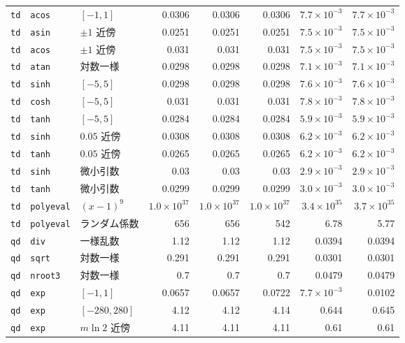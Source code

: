 \documentclass[a4paper,10pt]{ltjsarticle}
\begin{document}
\begin{longtable}{lll rrr rr}
\texttt{td} & \texttt{acos} & $[-1,1]$ & 0.0306 & 0.0306 & 0.0306 & $7.7\times10^{-3}$ & $7.7\times10^{-3}$ \\
\texttt{td} & \texttt{asin} & $\pm1$ 近傍 & 0.0251 & 0.0251 & 0.0251 & $7.5\times10^{-3}$ & $7.5\times10^{-3}$ \\
\texttt{td} & \texttt{acos} & $\pm1$ 近傍 & 0.031 & 0.031 & 0.031 & $7.5\times10^{-3}$ & $7.5\times10^{-3}$ \\
\texttt{td} & \texttt{atan} & 対数一様 & 0.0298 & 0.0298 & 0.0298 & $7.1\times10^{-3}$ & $7.1\times10^{-3}$ \\
\texttt{td} & \texttt{sinh} & $[-5,5]$ & 0.0298 & 0.0298 & 0.0298 & $7.6\times10^{-3}$ & $7.6\times10^{-3}$ \\
\texttt{td} & \texttt{cosh} & $[-5,5]$ & 0.031 & 0.031 & 0.031 & $7.8\times10^{-3}$ & $7.8\times10^{-3}$ \\
\texttt{td} & \texttt{tanh} & $[-5,5]$ & 0.0284 & 0.0284 & 0.0284 & $5.9\times10^{-3}$ & $5.9\times10^{-3}$ \\
\texttt{td} & \texttt{sinh} & $0.05$ 近傍 & 0.0308 & 0.0308 & 0.0308 & $6.2\times10^{-3}$ & $6.2\times10^{-3}$ \\
\texttt{td} & \texttt{tanh} & $0.05$ 近傍 & 0.0265 & 0.0265 & 0.0265 & $6.2\times10^{-3}$ & $6.2\times10^{-3}$ \\
\texttt{td} & \texttt{sinh} & 微小引数 & 0.03 & 0.03 & 0.03 & $2.9\times10^{-3}$ & $2.9\times10^{-3}$ \\
\texttt{td} & \texttt{tanh} & 微小引数 & 0.0299 & 0.0299 & 0.0299 & $3.0\times10^{-3}$ & $3.0\times10^{-3}$ \\
\texttt{td} & \texttt{polyeval} & $(x-1)^9$ & $1.0\times10^{37}$ & $1.0\times10^{37}$ & $1.0\times10^{37}$ & $3.4\times10^{35}$ & $3.7\times10^{35}$ \\
\texttt{td} & \texttt{polyeval} & ランダム係数 & 656 & 656 & 542 & 6.78 & 5.77 \\
\texttt{qd} & \texttt{div} & 一様乱数 & 1.12 & 1.12 & 1.12 & 0.0394 & 0.0394 \\
\texttt{qd} & \texttt{sqrt} & 対数一様 & 0.291 & 0.291 & 0.291 & 0.0301 & 0.0301 \\
\texttt{qd} & \texttt{nroot3} & 対数一様 & 0.7 & 0.7 & 0.7 & 0.0479 & 0.0479 \\
\texttt{qd} & \texttt{exp} & $[-1,1]$ & 0.0657 & 0.0657 & 0.0722 & $7.7\times10^{-3}$ & 0.0102 \\
\texttt{qd} & \texttt{exp} & $[-280,280]$ & 4.12 & 4.12 & 4.14 & 0.644 & 0.645 \\
\texttt{qd} & \texttt{exp} & $m\ln 2$ 近傍 & 4.11 & 4.11 & 4.11 & 0.61 & 0.61 \\

\end{longtable}
\end{document}
